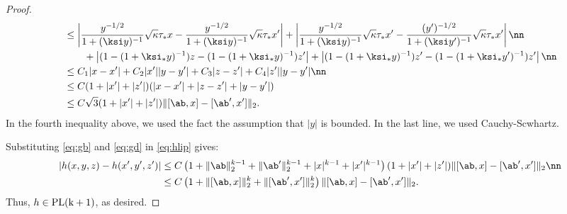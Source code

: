 \begin{proof}
\begin{align}
 &\leq
\left|\frac{y^{-1/2}}{1+(\ksi y)^{-1}}\sqrt{\kappa}\tau_* x - \frac{y^{-1/2}}{1+(\ksi y)^{-1}}\sqrt{\kappa}\tau_* x'\right| +\left|\frac{y^{-1/2}}{1+(\ksi y)^{-1}}\sqrt{\kappa}\tau_* x'- \frac{(y')^{-1/2}}{1+(\ksi y')^{-1}}\sqrt{\kappa}\tau_* x'\right|\nn\\
 &\qquad+ \left|(1-(1+\ksi_*y)^{-1})z-(1-(1+\ksi_*y)^{-1})z'\right| + \left|(1-(1+\ksi_*y)^{-1})z'-(1-(1+\ksi_*y')^{-1})z'\right| \nn\\
&\leq C_1|x-x'| + C_2|x'||y-y'| + C_3|z-z'| + C_4|z'||y-y'|\nn\\
&\leq C(1+|x'| + |z'|)(|x-x'| + |z-z'| + |y-y'|)\\
&\leq C\sqrt{3}(1+|x'| + |z'|)\|[\ab,x]-[\ab',x']\|_2
.\label{eq:gd}
\end{align}
In the fourth inequality above, we used the fact the assumption that $|y|$ is bounded. In the last line, we used Cauchy-Scwhartz.

Substituting \eqref{eq:gb} and \eqref{eq:gd} in \eqref{eq:hlip} gives:
\begin{align}
|h(x,y,z) - h(x',y',z')|  &\leq C\left(1+\|\ab\|_2^{k-1}+\|\ab'\|_2^{k-1}+|x|^{k-1}+|x'|^{k-1}\right)(1+|x'| + |z'|)\|[\ab,x]-[\ab',x']\|_2\nn \\
&\leq C\left(1+\|[\ab,x]\|_2^{k}+\|[\ab',x']\|_2^{k}\right)\|[\ab,x]-[\ab',x']\|_2.
\end{align}
Thus, $h\in\rm{PL}(k+1)$, as desired.
\end{proof}























